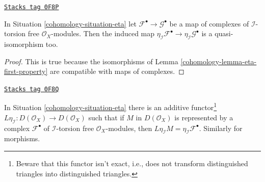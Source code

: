 \begin{lemma}
\label{cohomology-lemma-eta-qis}
\href{https://stacks.math.columbia.edu/tag/0F8P}{\texttt{Stacks tag 0F8P}}

In Situation \ref{cohomology-situation-eta}
let $\mathcal{F}^\bullet \to \mathcal{G}^\bullet$ be a map of
complexes of $\mathcal{I}$-torsion free $\mathcal{O}_X$-modules.
Then the induced map
$\eta_\mathcal{I}\mathcal{F}^\bullet \to \eta_\mathcal{I}\mathcal{G}^\bullet$
is a quasi-isomorphism too.
\end{lemma}

\begin{proof}

This is true because the isomorphisms of Lemma \ref{cohomology-lemma-eta-first-property}
are compatible with maps of complexes.
\end{proof}

\begin{lemma}[Leta]
\label{cohomology-lemma-Leta}
\href{https://stacks.math.columbia.edu/tag/0F8Q}{\texttt{Stacks tag 0F8Q}}

In Situation \ref{cohomology-situation-eta} there is an additive
functor\footnote{Beware that this functor isn't exact, i.e.,
does not transform distinguished triangles into distinguished triangles.}
$L\eta_\mathcal{I} : D(\mathcal{O}_X) \to D(\mathcal{O}_X)$
such that if $M$ in $D(\mathcal{O}_X)$ is represented by a complex
$\mathcal{F}^\bullet$ of $\mathcal{I}$-torsion free $\mathcal{O}_X$-modules,
then $L\eta_\mathcal{I}M = \eta_\mathcal{I}\mathcal{F}^\bullet$.
Similarly for morphisms.
\end{lemma}

